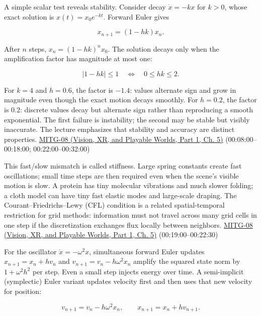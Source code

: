 A simple scalar test reveals stability. Consider decay \(\dot{x}=-kx\) for \(k>0\), whose exact solution is \(x(t)=x_0e^{-kt}\). Forward Euler gives

\[
x_{n+1}=(1-hk)x_n.
\]

After \(n\) steps, \(x_n=(1-hk)^nx_0\). The solution decays only when the amplification factor has magnitude at most one:

\[
|1-hk|\le1\quad\Longleftrightarrow\quad 0\le hk\le2.
\]

For \(k=4\) and \(h=0.6\), the factor is \(-1.4\): values alternate sign and grow in magnitude even though the exact motion decays smoothly. For \(h=0.2\), the factor is \(0.2\): discrete values decay but alternate sign rather than reproducing a smooth exponential. The first failure is instability; the second may be stable but visibly inaccurate. The lecture emphasizes that stability and accuracy are distinct properties. \href{../07-Vision-XR-and-Playable-Worlds-P01/main.pdf\#nameddest=04-visual-computing-ii-ch036-mitg-08---cloth-simulation}{MITG-08 (Vision, XR, and Playable Worlds, Part 1, Ch. 5)} (00:08:00--00:18:00; 00:22:00--00:32:00)

This fast/slow mismatch is called stiffness. Large spring constants create fast oscillations; small time steps are then required even when the scene's visible motion is slow. A protein has tiny molecular vibrations and much slower folding; a cloth model can have tiny fast elastic modes and large-scale draping. The Courant--Friedrichs--Lewy (CFL) condition is a related spatial-temporal restriction for grid methods: information must not travel across many grid cells in one step if the discretization exchanges flux locally between neighbors. \href{../07-Vision-XR-and-Playable-Worlds-P01/main.pdf\#nameddest=04-visual-computing-ii-ch036-mitg-08---cloth-simulation}{MITG-08 (Vision, XR, and Playable Worlds, Part 1, Ch. 5)} (00:19:00--00:22:30)

For the oscillator \(\ddot{x}=-\omega^2x\), simultaneous forward Euler updates \(x_{n+1}=x_n+h v_n\) and \(v_{n+1}=v_n-h\omega^2x_n\) amplify the squared state norm by \(1+\omega^2h^2\) per step. Even a small step injects energy over time. A semi-implicit (symplectic) Euler variant updates velocity first and then uses that new velocity for position:

\[
v_{n+1}=v_n-h\omega^2x_n,\qquad x_{n+1}=x_n+h v_{n+1}.
\]

